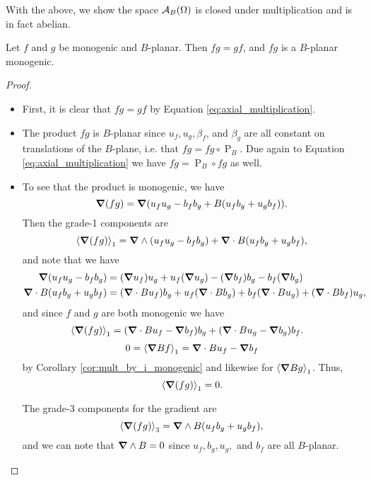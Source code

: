With the above, we show the space $\algebra{B}(\Omega)$ is closed under multiplication and is in fact abelian.
\begin{lemma}
\label{lem:product_of_monogenics}
    Let $f$ and $g$ be monogenic and $B$-planar. Then $fg=gf$, and $fg$ is a $B$-planar monogenic.
\end{lemma}
\begin{proof}~
    \begin{itemize}
        \item First, it is clear that $fg=gf$ by Equation \ref{eq:axial_multiplication}.
        \item The product $fg$ is $B$-planar since $u_f,u_g,\beta_f$, and $\beta_g$ are all constant on translations of the $B$-plane, i.e. that $fg = fg \circ \operatorname{P}_B$.  Due again to Equation \ref{eq:axial_multiplication} we have $fg = \operatorname{P}_B \circ fg$ as well.  
    \item To see that the product is monogenic, we have
    \[
        \grad(fg) = \grad(u_fu_g - b_f b_g +  B(u_f b_g + u_g b_f)).
    \]
    Then the grade-1 components are
    \[
        \proj{1}{\grad(fg)}=\grad \wedge (u_f u_g - b_f b_g) + \grad \cdot B(u_f b_g + u_g b_f),
    \]
    and note that we have
    \begin{align*}
        \grad(u_f u_g - b_f b_g) &= (\grad u_f) u_g + u_f (\grad u_g) - (\grad b_f) b_g - b_f (\grad b_g)\\
        \grad \cdot B(u_f b_g + u_g b_f) &= (\grad \cdot B u_f) b_g + u_f (\grad \cdot B b_g) + b_f(\grad \cdot B u_g) + (\grad \cdot B b_f) u_g,
    \end{align*}
    and since $f$ and $g$ are both monogenic we have
    \begin{align*}
        \proj{1}{\grad(fg)} &= (\grad \cdot B u_f - \grad  b_f)b_g + (\grad \cdot B u_g - \grad  b_g)b_f.
    \end{align*}
    \[
        0=\proj{1}{\grad Bf} = \grad \cdot B u_f - \grad b_f
    \]
    by Corollary \ref{cor:mult_by_i_monogenic} and likewise for $\proj{1}{\grad Bg}$. Thus,
    \[
        \proj{1}{\grad(fg)}=0.
    \]
    
    The grade-3 components for the gradient are
    \[
        \proj{3}{\grad(fg)} = \grad \wedge B (u_f b_g + u_g b_f),
    \]
    and we can note that $\grad \wedge B=0$ since $u_f,b_g,u_g,$ and $b_f$ are all $B$-planar.
\end{itemize}
\end{proof}

